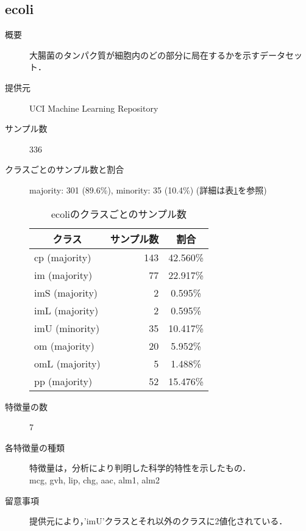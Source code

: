 \subsection{ecoli}
\begin{description}
    \item[概要] 大腸菌のタンパク質が細胞内のどの部分に局在するかを示すデータセット． \cite{ecoli}
    \item[提供元] UCI Machine Learning Repository
    \item[サンプル数] 336
    \item[クラスごとのサンプル数と割合] majority: 301 (89.6\%), minority: 35 (10.4\%) (詳細は表\ref{tab:ecoli}を参照)
        \begin{table}[htbp]
            \centering
            \caption{ecoliのクラスごとのサンプル数}
            \label{tab:ecoli}
            \begin{tabular}{lrc} \hline
                \multicolumn{1}{c}{クラス}&
                \multicolumn{1}{c}{サンプル数}&
                \multicolumn{1}{c}{割合}\\
                \hline
                \hline
                cp (majority)& 143 & 42.560\% \\
                im (majority)& 77 & 22.917\% \\
                imS (majority)& 2 & 0.595\% \\
                imL (majority)& 2 & 0.595\% \\
                imU (minority)& 35 & 10.417\% \\
                om (majority)& 20 & 5.952\% \\
                omL (majority)& 5 & 1.488\% \\
                pp (majority)& 52 & 15.476\% \\
                \hline
            \end{tabular}
        \end{table}
    \item[特徴量の数] 7
    \item[各特徴量の種類] 特徴量は，分析により判明した科学的特性を示したもの．\\
            mcg, gvh, lip, chg, aac, alm1, alm2
    \item[留意事項] 提供元により，'imU'クラスとそれ以外のクラスに2値化されている．
\end{description}

